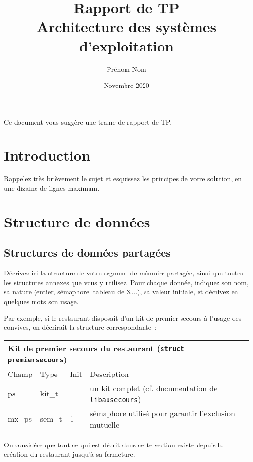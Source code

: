\documentclass[a4paper]{article}
\title{Rapport de TP \\ Architecture des systèmes d'exploitation}
\author{Prénom Nom}
\date{Novembre 2020}
\makeatletter
\newenvironment{expl}{%
  \begin{list}{}{%
      \small\itshape%
      \topsep\z@%
      \listparindent0pt%
      \parsep0.75\baselineskip%
      \setlength{\leftmargin}{20mm}%
      \setlength{\rightmargin}{20mm}%
    }
  \item[]}%
  {\end{list}}
\makeatother
\begin{document}
\maketitle


\begin{expl}
  Ce document vous suggère une trame de rapport de TP.
\end{expl}

\section{Introduction}

\begin{expl}
  Rappelez très brièvement le sujet et esquissez les principes de
  votre solution, en une dizaine de lignes maximum.
\end{expl}

\section{Structure de données}

\subsection{Structures de données partagées}\label{sec-shm}

\begin{expl}
  Décrivez ici la structure de votre segment de mémoire partagée,
  ainsi que toutes les structures annexes que vous y utilisez. Pour
  chaque donnée, indiquez son nom, sa nature (entier, sémaphore,
  tableau de X...), sa valeur initiale, et décrivez en quelques
  mots son usage.

  Par exemple, si le restaurant disposait d'un kit de premier secours
  à l'usage des convives, on décrirait la structure correspondante~:

  \begin{tabularx}{\linewidth}{|l|l|l|X|}
    \hline
    \multicolumn{4}{|l|}{Kit de premier secours du restaurant
      (\texttt{struct premiersecours})}
    \\ \hline
    Champ & Type & Init & Description \\ \hline
    ps & kit\_t & -- & un kit complet (cf. documentation de
    \texttt{libausecours}) \\ \hline
    mx\_ps & sem\_t & 1 & sémaphore utilisé pour garantir l'exclusion
    mutuelle
    \\ \hline
  \end{tabularx}

  On considère que tout ce qui est décrit dans cette section existe
  depuis la création du restaurant jusqu'à sa fermeture.
\end{expl}
\end{document}
